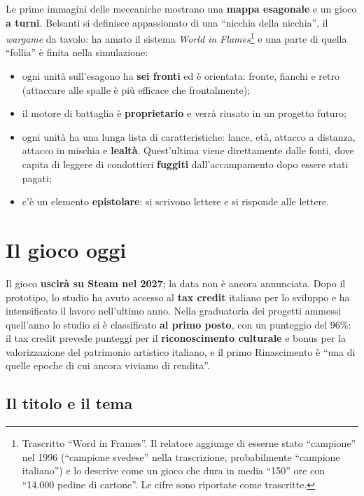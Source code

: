 Le prime immagini delle meccaniche mostrano una \textbf{mappa esagonale} e un
gioco \textbf{a turni}. Belsanti si definisce appassionato di una ``nicchia della
nicchia'', il \emph{wargame} da tavolo: ha amato il sistema \emph{World in
Flames}\footnote{Trascritto ``Word in Frames''. Il relatore aggiunge di esserne
stato ``campione'' nel 1996 (``campione svedese'' nella trascrizione,
probabilmente ``campione italiano'') e lo descrive come un gioco che dura in
media ``150'' ore con ``14.000 pedine di cartone''. Le cifre sono riportate come
trascritte.} e una parte di quella ``follia'' è finita nella simulazione:
\begin{itemize}
  \item ogni unità sull'esagono ha \textbf{sei fronti} ed è orientata: fronte,
        fianchi e retro (attaccare alle spalle è più efficace che frontalmente);
  \item il motore di battaglia è \textbf{proprietario} e verrà riusato in un
        progetto futuro;
  \item ogni unità ha una lunga lista di caratteristiche: lance, età, attacco a
        distanza, attacco in mischia e \textbf{lealtà}. Quest'ultima viene
        direttamente dalle fonti, dove capita di leggere di condottieri
        \textbf{fuggiti} dall'accampamento dopo essere stati pagati;
  \item c'è un elemento \textbf{epistolare}: si scrivono lettere e si risponde
        alle lettere.
\end{itemize}

\section{Il gioco oggi}
\label{sec:c1-2-gioco}

Il gioco \textbf{uscirà su Steam nel 2027}; la data non è ancora annunciata.
Dopo il prototipo, lo studio ha avuto accesso al \textbf{tax credit} italiano
per lo sviluppo e ha intensificato il lavoro nell'ultimo anno. Nella graduatoria
dei progetti ammessi quell'anno lo studio si è classificato \textbf{al primo
posto}, con un punteggio del 96\%: il tax credit prevede punteggi per il
\textbf{riconoscimento culturale} e bonus per la valorizzazione del patrimonio
artistico italiano, e il primo Rinascimento è ``una di quelle epoche di cui
ancora viviamo di rendita''.

\subsection{Il titolo e il tema}

